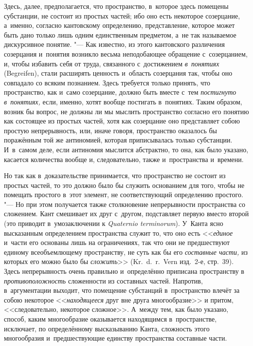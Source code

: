 Здесь, далее, предполагается, что пространство, в~которое здесь помещены
субстанции, не состоит из простых частей; ибо оно есть некоторое созерцание,
а~именно, согласно кантовскому определению, представление, которое может быть
дано только лишь одним единственным предметом, а~не так называемое дискурсивное
понятие. "--- Как известно, из этого кантовского различения созерцания
и~понятия возникло весьма неподобающее обращение с~созерцанием, и, чтобы
избавить себя от труда, связанного с~достижением {\em в~понятиях} (Begreifen),
стали расширять ценность и~область созерцания так, чтобы оно совпадало со
всяким познанием. Здесь требуется только принять, что пространство, как и~само
созерцание, должно быть вместе с~тем {\em постигнуто в~понятиях,} если, именно,
хотят вообще постигать в~понятиях. Таким образом, возник бы вопрос, не должны
ли мы мыслить пространство согласно его понятию как состоящее из простых
частей, хотя как созерцание оно представляет собою простую непрерывность, или,
иначе говоря, пространство оказалось бы поражённым той же антиномией, которая
приписывалась только субстанции. И~в~самом деле, если антиномия мыслится
абстрактно, то она, как было указано, касается количества вообще и,
следовательно, также и~пространства и~времени.

Но так как в~доказательстве принимается, что пространство не состоит из
простых частей, то это должно было бы служить основанием для того, чтобы не
помещать простого в~этот элемент, не соответствующий определению простого.
"--- Но при этом получается также столкновение непрерывности пространства со
сложением. Кант смешивает их друг с~другом, подставляет первую вместо
второй (это приводит в~умозаключении к {\em Quaternio terminorum}). У~Канта
ясно высказанным определением пространства служит то,
что оно есть <<{\em единое} и~части его основаны лишь на
ограничениях, так что они не предшествуют единому всеобъемлющему
пространству, не суть как бы его {\em составные части,}
из которых его можно было бы {\em сложить}>> (Kr.~d.~r.~Vern
изд.~2-е, стр.~39). Здесь непрерывность очень правильно и~определённо
приписана пространству в {\em противоположность}
сложенности из составных частей. Напротив, в~аргументации выходит, что
помещение субстанций в~пространство влечёт за собою некоторое
<<{\em находящееся} друг вне друга многообразие>> и
притом, <<следовательно, некоторое сложное>>. А~между тем, как было указано,
способ, каким многообразие оказывается находящимся в~пространстве,
исключает, по определённому высказыванию Канта, сложность этого
многообразия и~предшествующие единству пространства составные части.

